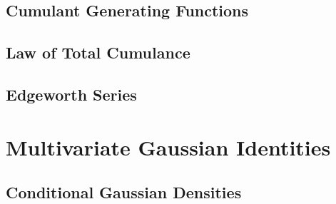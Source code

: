 \documentclass[11pt]{report} %
\begin{document}
\subsection{Cumulant Generating Functions}

\subsection{Law of Total Cumulance}

\subsection{Edgeworth Series}

\section{Multivariate Gaussian Identities}

\subsection{Conditional Gaussian Densities}
\end{document}

